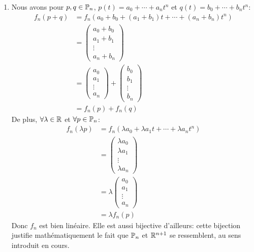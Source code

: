 \begin{exercice}
\begin{enumerate}
    \item Nous avons pour $p,q \in \P_n$, $p(t) = a_0 + \cdots + a_n t^n$ et $q(t) = b_0 + \cdots + b_n t^n$:
    \begin{align*}
        f_n(p+q) &= f_n\left(a_0 + b_0 + (a_1 + b_1)t + \cdots + (a_n + b_n)t^n\right) \\
        &= \begin{pmatrix} a_0 + b_0 \\ a_1 + b_1 \\ \vdots \\ a_n + b_n \end{pmatrix} \\
        &= \begin{pmatrix} a_0 \\ a_1 \\ \vdots \\ a_n \end{pmatrix} + \begin{pmatrix} b_0 \\ b_1 \\ \vdots \\ b_n \end{pmatrix} \\
        &= f_n(p) + f_n(q)
    \end{align*}
    De plus, $\forall \lambda \in \R$ et $\forall p \in \P_n$:
    \begin{align*}
        f_n(\lambda p) &= f_n(\lambda a_0 + \lambda a_1 t + \cdots + \lambda a_n t^n) \\
        &= \begin{pmatrix} \lambda a_0 \\ \lambda a_1 \\ \vdots \\ \lambda a_n \end{pmatrix} \\
        &= \lambda \begin{pmatrix} a_0 \\ a_1 \\ \vdots \\ a_n \end{pmatrix} \\
        &= \lambda f_n(p)
    \end{align*}
    Donc $f_n$ est bien linéaire. Elle est aussi bijective d'ailleurs: cette bijection justifie mathématiquement le fait que $\P_n$ et $\R^{n+1}$ se ressemblent, au sens introduit en cours. \\
\end{enumerate}
\end{exercice}

